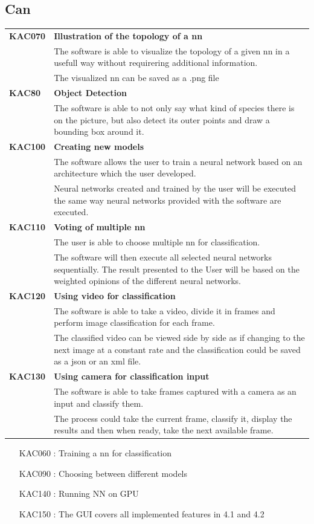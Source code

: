 \documentclass[parskip=full]{scrartcl}
\begin{document}
\subsection{Can}
\begin{tabular}{p{2cm}p{11.4cm}}
\textbf{KAC070} & \textbf{Illustration of the topology of a nn} \\
& The software is able to visualize the topology of a given nn in a usefull way without requirering additional information. \\
& The visualized nn can be saved as a .png file\\
\textbf{KAC80} & \textbf{Object Detection} \\
&The software is able to not only say what kind of species there is on the picture, but also detect its outer points and draw a bounding box around it. \\ 
\textbf{KAC100} & \textbf{Creating new models} \\
& The software allows the user to train a neural network based on an architecture which the user developed.\\
& Neural networks created and trained by the user will be executed the same way neural networks provided with the software are executed.\\
\textbf{KAC110} & \textbf{Voting of multiple nn} \\
& The user is able to choose multiple nn for classification.\\
& The software will then execute all selected neural networks sequentially. The result presented to the User will be based on the weighted opinions of the different neural networks.\\
\textbf{KAC120} & \textbf{Using video for classification} \\
& The software is able to take a video, divide it in frames and perform image classification for each frame.\\
& The classified video can be viewed side by side as if changing to the next image at a constant rate and the classification could be saved as a \gls{json} or an \gls{xml} file.\\
\textbf{KAC130} & \textbf{Using camera for classification input} \\
& The software is able to take frames captured with a camera as an input and classify them.\\
& The process could take the current frame, classify it, display the results and then when ready, take the next available frame.
\end{tabular}
\begin{itemize}[nosep]
\item [KAC060]: Training a nn for classification
\item [KAC090]: Choosing between different models
\item [KAC140]: Running NN on GPU
\item [KAC150]: The GUI covers all implemented features in 4.1 and 4.2
\end{itemize}
\end{document}
